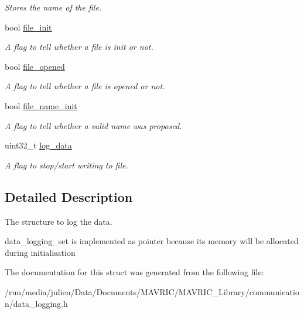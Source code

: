 \begin{DoxyCompactItemize}
\begin{DoxyCompactList}\small\item\em Stores the name of the file. \end{DoxyCompactList}\item 
\hypertarget{structdata__logging__t_a7377a9cab63036ab7beead51d86cbaa8}{bool \hyperlink{structdata__logging__t_a7377a9cab63036ab7beead51d86cbaa8}{file\+\_\+init}}\label{structdata__logging__t_a7377a9cab63036ab7beead51d86cbaa8}

\begin{DoxyCompactList}\small\item\em A flag to tell whether a file is init or not. \end{DoxyCompactList}\item 
\hypertarget{structdata__logging__t_a6b3a84e1f855a23fe0956c6b19b65431}{bool \hyperlink{structdata__logging__t_a6b3a84e1f855a23fe0956c6b19b65431}{file\+\_\+opened}}\label{structdata__logging__t_a6b3a84e1f855a23fe0956c6b19b65431}

\begin{DoxyCompactList}\small\item\em A flag to tell whether a file is opened or not. \end{DoxyCompactList}\item 
\hypertarget{structdata__logging__t_ad06710057373db38839bfd986e67d40e}{bool \hyperlink{structdata__logging__t_ad06710057373db38839bfd986e67d40e}{file\+\_\+name\+\_\+init}}\label{structdata__logging__t_ad06710057373db38839bfd986e67d40e}

\begin{DoxyCompactList}\small\item\em A flag to tell whether a valid name was proposed. \end{DoxyCompactList}\item 
\hypertarget{structdata__logging__t_a847c3c78ad347abdb57324c6b5d1f78c}{uint32\+\_\+t \hyperlink{structdata__logging__t_a847c3c78ad347abdb57324c6b5d1f78c}{log\+\_\+data}}\label{structdata__logging__t_a847c3c78ad347abdb57324c6b5d1f78c}

\begin{DoxyCompactList}\small\item\em A flag to stop/start writing to file. \end{DoxyCompactList}\end{DoxyCompactItemize}


\subsection{Detailed Description}
The structure to log the data. 

data\+\_\+logging\+\_\+set is implemented as pointer because its memory will be allocated during initialisation 

The documentation for this struct was generated from the following file\+:\begin{DoxyCompactItemize}
\item 
/run/media/julien/\+Data/\+Documents/\+M\+A\+V\+R\+I\+C/\+M\+A\+V\+R\+I\+C\+\_\+\+Library/communication/data\+\_\+logging.\+h\end{DoxyCompactItemize}
